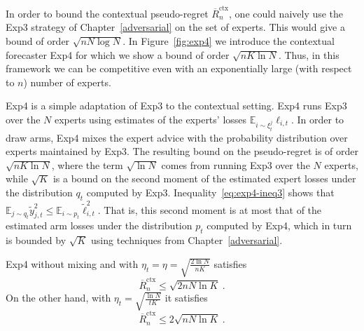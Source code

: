 \documentclass[11pt]{hackednow}
\newcommand{\E}{\mathbb{E}}
\newcommand{\oR}{\overline{R}}
\renewcommand{\tilde}{\widetilde}
\newcommand{\oRx}{\oR^{\mathrm{ctx}}}
\begin{document}
In order to bound the contextual pseudo-regret $\oRx_n$, one could naively use the Exp3 strategy of Chapter~\ref{adversarial} on the set of experts. This would give a bound of order $\sqrt{n N \log N}$. In Figure~\ref{fig:exp4} we introduce the contextual forecaster Exp4 for which we show a bound of order $\sqrt{n K \ln N}$. Thus, in this framework we can be competitive even with an exponentially large (with respect to $n$) number of experts.

Exp4 is a simple adaptation of Exp3 to the contextual setting. Exp4 runs Exp3 over the $N$ experts using estimates of the experts' losses $\E_{i \sim \xi_t^j} \ell_{i,t}$. In order to draw arms, Exp4 mixes the expert advice with the probability distribution over experts maintained by Exp3. The resulting bound on the pseudo-regret is of order $\sqrt{nK\ln N}$, where the term $\sqrt{\ln N}$ comes from running Exp3 over the $N$ experts, while $\sqrt{K}$ is a bound on the second moment of the estimated expert losses under the distribution $q_t$ computed by Exp3. Inequality~\eqref{eq:exp4-ineq3} shows that $\E_{j \sim q_t} \tilde{y}^2_{j,t} \le \E_{i \sim p_t} \tilde{\ell}_{i,t}^2$. That is, this second moment is at most that of the estimated arm losses under the distribution $p_t$ computed by Exp4, which in turn is bounded by $\sqrt{K}$ using techniques from Chapter~\ref{adversarial}.
%
\begin{theorem}
\label{th:Exp4}
Exp4 without mixing and with $\eta_t=\eta = \sqrt{\frac{2 \ln N}{n K}}$ satisfies
\begin{equation} \label{eq:exp4bound}
	\oRx_n \leq \sqrt{2 n N \ln K}~.
\end{equation}
On the other hand, with $\eta_t = \sqrt{\frac{\ln N}{t K}}$ it satisfies
\begin{equation} \label{eq:exp4boundanytime}
	\oRx_n \leq 2 \sqrt{n N \ln K}~.
\end{equation}
\end{theorem}
\end{document}
